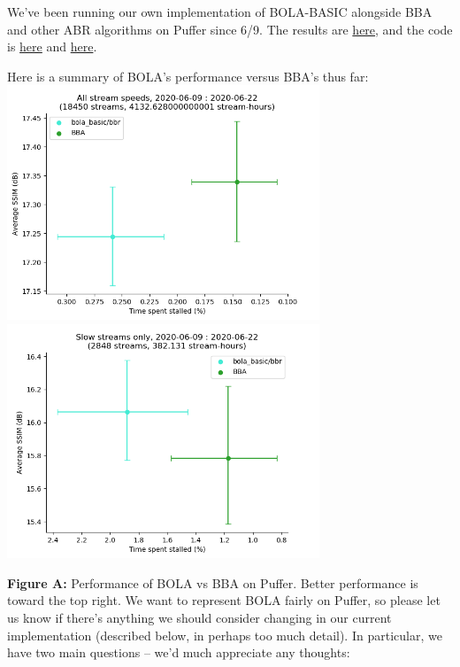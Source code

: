 \documentclass[12pt]{article}
\begin{document}
We've been running our own implementation of BOLA-BASIC alongside BBA and other ABR algorithms on Puffer since 6/9. The results are
\href{https://puffer.stanford.edu/results/}{here}, and the code is \href{https://github.com/StanfordSNR/puffer/blob/master/src/abr/bola_basic.cc}{here} and \href{https://github.com/StanfordSNR/puffer/blob/master/src/abr/bola_basic.hh}{here}. 

Here is a summary of BOLA's performance versus BBA's thus far:\\
\includegraphics[width=0.7\textwidth]{duration_all_plot.png}\\
\includegraphics[width=0.7\textwidth]{duration_slow_plot.png}

\textbf{Figure A:} Performance of BOLA vs BBA on Puffer. Better performance is toward the top right.
\newpage
We want to represent BOLA fairly on Puffer, so please let us know if there's anything we should consider changing in our current implementation (described below, in perhaps too much detail). In particular, we have two main questions -- we'd much appreciate any thoughts: \\
\end{document}
